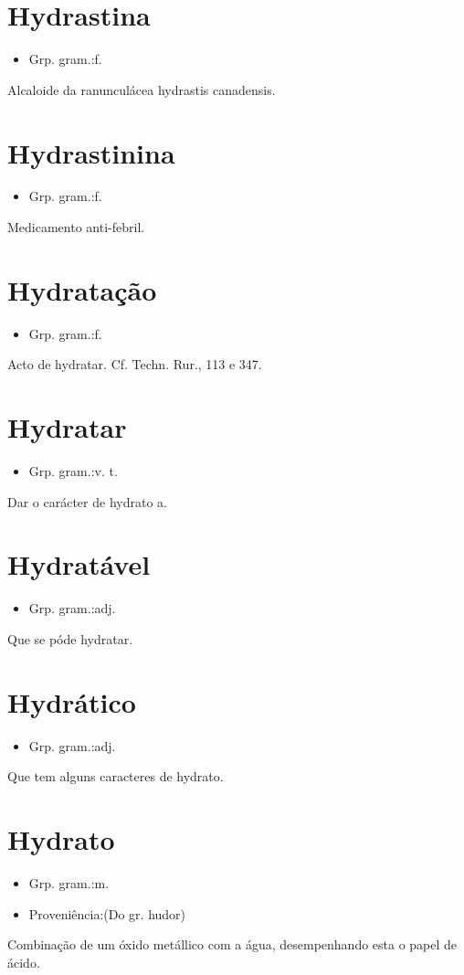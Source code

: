 \documentclass{article}
\begin{document}
\section{Hydrastina}
\begin{itemize}
\item {Grp. gram.:f.}
\end{itemize}
Alcaloide da ranunculácea \textunderscore hydrastis canadensis\textunderscore .
\section{Hydrastinina}
\begin{itemize}
\item {Grp. gram.:f.}
\end{itemize}
Medicamento anti-febril.
\section{Hydratação}
\begin{itemize}
\item {Grp. gram.:f.}
\end{itemize}
Acto de hydratar. Cf. \textunderscore Techn. Rur.\textunderscore , 113 e 347.
\section{Hydratar}
\begin{itemize}
\item {Grp. gram.:v. t.}
\end{itemize}
Dar o carácter de hydrato a.
\section{Hydratável}
\begin{itemize}
\item {Grp. gram.:adj.}
\end{itemize}
Que se póde hydratar.
\section{Hydrático}
\begin{itemize}
\item {Grp. gram.:adj.}
\end{itemize}
Que tem alguns caracteres de hydrato.
\section{Hydrato}
\begin{itemize}
\item {Grp. gram.:m.}
\end{itemize}
\begin{itemize}
\item {Proveniência:(Do gr. \textunderscore hudor\textunderscore )}
\end{itemize}
Combinação de um óxido metállico com a água, desempenhando esta o papel de ácido.
\end{document}
